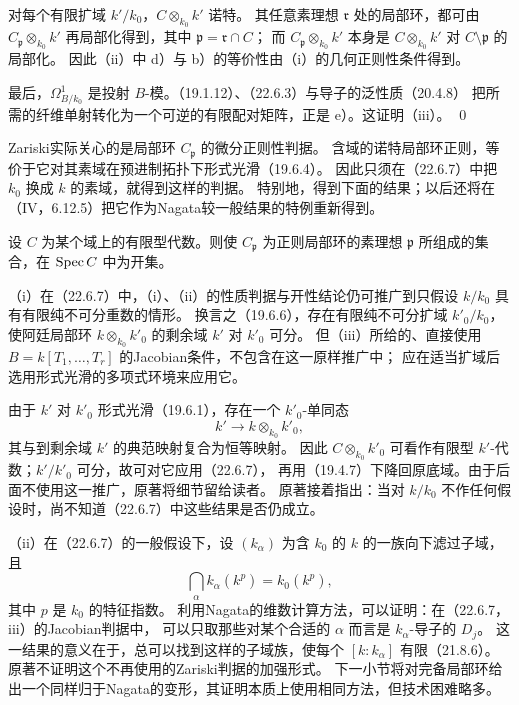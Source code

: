 对每个有限扩域 $k'/k_0$，$C\otimes_{k_0}k'$ 诺特。
其任意素理想 $\mathfrak r$ 处的局部环，都可由 $C_{\mathfrak p}\otimes_{k_0}k'$ 再局部化得到，其中 $\mathfrak p=\mathfrak r\cap C$；
而 $C_{\mathfrak p}\otimes_{k_0}k'$ 本身是 $C\otimes_{k_0}k'$ 对 $C\setminus\mathfrak p$ 的局部化。
因此（ii）中 d）与 b）的等价性由（i）的几何正则性条件得到。

最后，$\Omega^1_{B/k_0}$ 是投射 $B$-模。（19.1.12）、（22.6.3）与导子的泛性质（20.4.8）
把所需的纤维单射转化为一个可逆的有限配对矩阵，正是 e）。这证明（iii）。
\qed\par

Zariski实际关心的是局部环 $C_{\mathfrak p}$ 的微分正则性判据。
含域的诺特局部环正则，等价于它对其素域在预进制拓扑下形式光滑（19.6.4）。
因此只须在（22.6.7）中把 $k_0$ 换成 $k$ 的素域，就得到这样的判据。
特别地，得到下面的结果；以后还将在（IV，6.12.5）把它作为Nagata较一般结果的特例重新得到。

设 $C$ 为某个域上的有限型代数。则使 $C_{\mathfrak p}$ 为正则局部环的素理想 $\mathfrak p$ 所组成的集合，在 $\operatorname{Spec} C$ 中为开集。

（i）在（22.6.7）中，（i）、（ii）的性质判据与开性结论仍可推广到只假设 $k/k_0$ 具有有限纯不可分重数的情形。
换言之（19.6.6），存在有限纯不可分扩域 $k'_0/k_0$，使阿廷局部环 $k\otimes_{k_0}k'_0$ 的剩余域 $k'$ 对 $k'_0$ 可分。
但（iii）所给的、直接使用 $B=k[T_1,\ldots,T_r]$ 的Jacobian条件，不包含在这一原样推广中；
应在适当扩域后选用形式光滑的多项式环境来应用它。

由于 $k'$ 对 $k'_0$ 形式光滑（19.6.1），存在一个 $k'_0$-单同态
\[
 k'\longrightarrow k\otimes_{k_0}k'_0,
\]
其与到剩余域 $k'$ 的典范映射复合为恒等映射。
因此 $C\otimes_{k_0}k'_0$ 可看作有限型 $k'$-代数；$k'/k'_0$ 可分，故可对它应用（22.6.7），
再用（19.4.7）下降回原底域。由于后面不使用这一推广，原著将细节留给读者。
原著接着指出：当对 $k/k_0$ 不作任何假设时，尚不知道（22.6.7）中这些结果是否仍成立。

（ii）在（22.6.7）的一般假设下，设 $(k_\alpha)$ 为含 $k_0$ 的 $k$ 的一族向下滤过子域，且
\[
 \bigcap_\alpha k_\alpha(k^p)=k_0(k^p),
\]
其中 $p$ 是 $k_0$ 的特征指数。
利用Nagata的维数计算方法，可以证明：在（22.6.7，iii）的Jacobian判据中，
可以只取那些对某个合适的 $\alpha$ 而言是 $k_\alpha$-导子的 $D_j$。
这一结果的意义在于，总可以找到这样的子域族，使每个 $[k:k_\alpha]$ 有限（21.8.6）。
原著不证明这个不再使用的Zariski判据的加强形式。
下一小节将对完备局部环给出一个同样归于Nagata的变形，其证明本质上使用相同方法，但技术困难略多。
